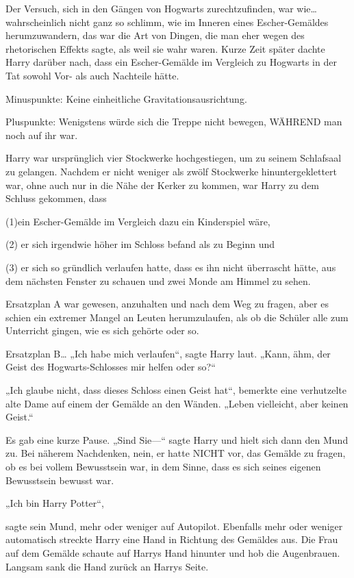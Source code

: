 {Der Versuch, sich in den Gängen von Hogwarts zurechtzufinden, war wie… wahrscheinlich nicht ganz so schlimm, wie im Inneren eines Escher-Gemäldes herumzuwandern, das war die Art von Dingen, die man eher wegen des rhetorischen Effekts sagte, als weil sie wahr waren. Kurze Zeit später dachte Harry darüber nach, dass ein Escher-Gemälde im Vergleich zu Hogwarts in der Tat sowohl Vor- als auch Nachteile hätte.

Minuspunkte: Keine einheitliche Gravitationsausrichtung.

Pluspunkte: Wenigstens würde sich die Treppe nicht bewegen, WÄHREND man noch auf ihr war.

Harry war ursprünglich vier Stockwerke hochgestiegen, um zu seinem Schlafsaal zu gelangen. Nachdem er nicht weniger als zwölf Stockwerke hinuntergeklettert war, ohne auch nur in die Nähe der Kerker zu kommen, war Harry zu dem Schluss gekommen, dass

(1)ein Escher-Gemälde im Vergleich dazu ein Kinderspiel wäre,

(2) er sich irgendwie höher im Schloss befand als zu Beginn und

(3) er sich so gründlich verlaufen hatte, dass es ihn nicht überrascht hätte, aus dem nächsten Fenster zu schauen und zwei Monde am Himmel zu sehen.

Ersatzplan A war gewesen, anzuhalten und nach dem Weg zu fragen, aber es schien ein extremer Mangel an Leuten herumzulaufen, als ob die Schüler alle zum Unterricht gingen, wie es sich gehörte oder so.

Ersatzplan B… „Ich habe mich verlaufen“, sagte Harry laut. „Kann, ähm, der Geist des Hogwarts-Schlosses mir helfen oder so?“

„Ich glaube nicht, dass dieses Schloss einen Geist hat“, bemerkte eine verhutzelte alte Dame auf einem der Gemälde an den Wänden. „Leben vielleicht, aber keinen Geist.“

Es gab eine kurze Pause. „Sind Sie—“ sagte Harry und hielt sich dann den Mund zu. Bei näherem Nachdenken, nein, er hatte NICHT vor, das Gemälde zu fragen, ob es bei vollem Bewusstsein war, in dem Sinne, dass es sich seines eigenen Bewusstsein bewusst war.

„Ich bin Harry Potter“,

sagte sein Mund, mehr oder weniger auf Autopilot. Ebenfalls mehr oder weniger automatisch streckte Harry eine Hand in Richtung des Gemäldes aus. Die Frau auf dem Gemälde schaute auf Harrys Hand hinunter und hob die Augenbrauen. Langsam sank die Hand zurück an Harrys Seite.

}
